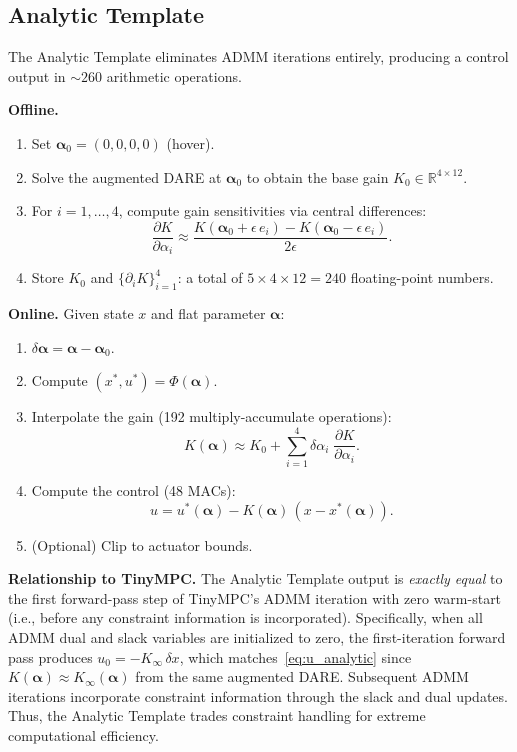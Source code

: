 \documentclass[letterpaper, 10pt, conference]{IEEEtran}
\newcommand{\R}{\mathbb{R}}
\newcommand{\balpha}{\bm{\alpha}}
\begin{document}
\subsection{Analytic Template}\label{sec:analytic}

The Analytic Template eliminates ADMM iterations entirely,
producing a control output in ${\sim}260$ arithmetic operations.

\textbf{Offline.}
\begin{enumerate}
  \item Set $\balpha_0 = (0, 0, 0, 0)$ (hover).
  \item Solve the augmented DARE at $\balpha_0$ to obtain
    the base gain $K_0 \in \R^{4 \times 12}$.
  \item For $i = 1, \ldots, 4$, compute gain sensitivities
    via central differences:
    \begin{equation}\label{eq:dK}
      \frac{\partial K}{\partial \alpha_i} \approx
      \frac{K(\balpha_0 + \epsilon \, e_i) - K(\balpha_0 - \epsilon \, e_i)}
           {2\epsilon}.
    \end{equation}
  \item Store $K_0$ and $\{\partial_i K\}_{i=1}^4$:
    a total of $5 \times 4 \times 12 = 240$ floating-point numbers.
\end{enumerate}

\textbf{Online.}
Given state $x$ and flat parameter $\balpha$:
\begin{enumerate}
  \item $\delta \balpha = \balpha - \balpha_0$.
  \item Compute $(x^*, u^*) = \Phi(\balpha)$.
  \item Interpolate the gain (192 multiply-accumulate operations):
    \begin{equation}\label{eq:K_interp}
      K(\balpha) \approx K_0 + \sum_{i=1}^{4} \delta\alpha_i \; \frac{\partial K}{\partial \alpha_i}.
    \end{equation}
  \item Compute the control (48 MACs):
    \begin{equation}\label{eq:u_analytic}
      u = u^*(\balpha) - K(\balpha) \, (x - x^*(\balpha)).
    \end{equation}
  \item (Optional) Clip to actuator bounds.
\end{enumerate}

\textbf{Relationship to TinyMPC.}
The Analytic Template output is \emph{exactly equal} to
the first forward-pass step of TinyMPC's ADMM iteration
with zero warm-start (i.e., before any constraint information
is incorporated).
Specifically, when all ADMM dual and slack variables are initialized
to zero, the first-iteration forward pass produces
$u_0 = -K_\infty \, \delta x$,
which matches~\eqref{eq:u_analytic} since $K(\balpha) \approx K_\infty(\balpha)$
from the same augmented DARE.
Subsequent ADMM iterations incorporate constraint information
through the slack and dual updates.
Thus, the Analytic Template trades constraint handling for
extreme computational efficiency.
\end{document}

